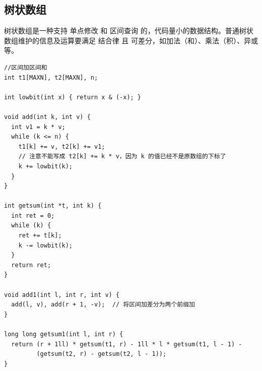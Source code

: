 \documentclass[10pt,a4paper]{article}
\begin{document}
\subsection{树状数组}
树状数组是一种支持 单点修改 和 区间查询 的，代码量小的数据结构。普通树状数组维护的信息及运算要满足 结合律 且 可差分，如加法（和）、乘法（积）、异或等。
\begin{lstlisting}[caption={}]
//区间加区间和
int t1[MAXN], t2[MAXN], n;

int lowbit(int x) { return x & (-x); }

void add(int k, int v) {
  int v1 = k * v;
  while (k <= n) {
    t1[k] += v, t2[k] += v1;
    // 注意不能写成 t2[k] += k * v，因为 k 的值已经不是原数组的下标了
    k += lowbit(k);
  }
}

int getsum(int *t, int k) {
  int ret = 0;
  while (k) {
    ret += t[k];
    k -= lowbit(k);
  }
  return ret;
}

void add1(int l, int r, int v) {
  add(l, v), add(r + 1, -v);  // 将区间加差分为两个前缀加
}

long long getsum1(int l, int r) {
  return (r + 1ll) * getsum(t1, r) - 1ll * l * getsum(t1, l - 1) -
         (getsum(t2, r) - getsum(t2, l - 1));
}
\end{lstlisting}
\end{document}
